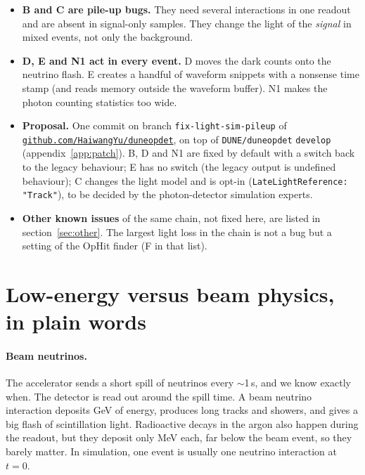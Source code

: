 \documentclass[10pt]{article}
\newcommand{\code}[1]{\texttt{#1}}
\begin{document}
\begin{itemize}
\item \textbf{B and C are pile-up bugs.} They need several interactions in one readout and are absent in signal-only
  samples. They change the light of the \emph{signal} in mixed events, not only the background.
\item \textbf{D, E and N1 act in every event.} D moves the dark counts onto the neutrino flash. E creates a handful of
  waveform snippets with a nonsense time stamp (and reads memory outside the waveform buffer). N1 makes the photon
  counting statistics too wide.
\item \textbf{Proposal.} One commit on branch \code{fix-light-sim-pileup} of
  \href{https://github.com/HaiwangYu/duneopdet/tree/fix-light-sim-pileup}{\code{github.com/HaiwangYu/duneopdet}},
  on top of \code{DUNE/duneopdet} \code{develop} (appendix~\ref{app:patch}). B, D and N1 are fixed by default with a switch back to
  the legacy behaviour; E has no switch (the legacy output is undefined behaviour); C changes the light model and is
  opt-in (\code{LateLightReference: "Track"}), to be decided by the photon-detector simulation experts.
\item \textbf{Other known issues} of the same chain, not fixed here, are listed in section~\ref{sec:other}. The
  largest light loss in the chain is not a bug but a setting of the OpHit finder (F in that list).
\end{itemize}

\section{Low-energy versus beam physics, in plain words}
\label{sec:le}

\paragraph{Beam neutrinos.} The accelerator sends a short spill of neutrinos every $\sim$1\,s, and we know exactly when.
The detector is read out around the spill time. A beam neutrino interaction deposits GeV of energy, produces long
tracks and showers, and gives a big flash of scintillation light. Radioactive decays in the argon also happen during
the readout, but they deposit only MeV each, far below the beam event, so they barely matter. In simulation, one
event is usually one neutrino interaction at $t=0$.
\end{document}
